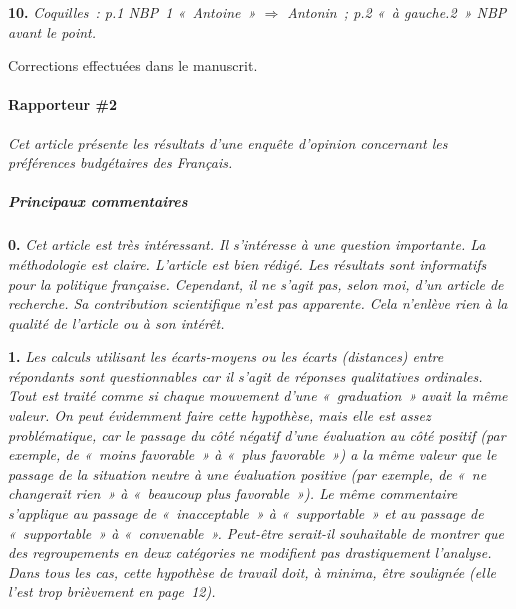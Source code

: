 \documentclass[12pt,french]{article}
\begin{document}
\bigskip
\noindent\textbf{10.} \textit{Coquilles~: p.1 NBP~1 «~Antoine~» $\Rightarrow$ Antonin~; p.2 «~à gauche.2~» NBP avant le point.}

Corrections effectuées dans le manuscrit.

\bigskip

\paragraph*{Rapporteur \#2}

\textit{Cet article présente les résultats d'une enquête d'opinion concernant les préférences budgétaires des Français.}

\subparagraph*{Principaux commentaires}

\bigskip
\noindent\textbf{0.} \textit{Cet article est très intéressant. Il s'intéresse à une question importante. La méthodologie est claire. L'article est bien rédigé. Les résultats sont informatifs pour la politique française. Cependant, il ne s'agit pas, selon moi, d'un article de recherche. Sa contribution scientifique n'est pas apparente. Cela n'enlève rien à la qualité de l'article ou à son intérêt.}



\bigskip
\noindent\textbf{1.} \textit{Les calculs utilisant les écarts-moyens ou les écarts (distances) entre répondants sont questionnables car il s'agit de réponses qualitatives ordinales. Tout est traité comme si chaque mouvement d'une «~graduation~» avait la même valeur. On peut évidemment faire cette hypothèse, mais elle est assez problématique, car le passage du côté négatif d'une évaluation au côté positif (par exemple, de «~moins favorable~» à «~plus favorable~») a la même valeur que le passage de la situation neutre à une évaluation positive (par exemple, de «~ne changerait rien~» à «~beaucoup plus favorable~»). Le même commentaire s'applique au passage de «~inacceptable~» à «~supportable~» et au passage de «~supportable~» à «~convenable~». Peut-être serait-il souhaitable de montrer que des regroupements en deux catégories ne modifient pas drastiquement l'analyse. Dans tous les cas, cette hypothèse de travail doit, à minima, être soulignée (elle l'est trop brièvement en page~12).}
\end{document}
